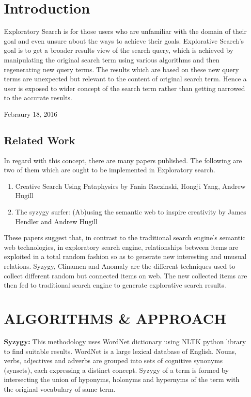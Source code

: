 \documentclass[conference]{IEEEtran}
\begin{document}
 

\section{Introduction}

\hspace{10 pt} Exploratory  Search is for those users who are unfamiliar with the domain of their goal and even unsure about the ways to achieve their goals. Explorative Search's goal is to get a broader results view of the search query, which is achieved by manipulating the original search term using various algorithms and then regenerating new query terms. The results which are based on these new query terms are unexpected but relevant to the content of original search term. Hence a user is exposed to wider concept of the search term rather than getting narrowed to the accurate results.

 
\hfill Febraury 18, 2016
\subsection{Related Work}


In regard with this concept, there are many papers published. The following are two of them which are  ought to be implemented in Exploratory search.\\
\begin{enumerate}
\item Creative Search Using Pataphysics by Fania Raczinski, Hongji Yang, Andrew Hugill
\item The syzygy surfer: (Ab)using the semantic web to inspire creativity by James Hendler and  Andrew Hugill \\
\end{enumerate}
These papers suggest that, in contrast to the traditional search engine's semantic web technologies, in exploratory search engine, relationships between items are exploited in a total random fashion so as to generate new interesting and unusual relations. Syzygy, Clinamen and Anomaly are the different techniques used to collect different random but connected items on web. The new collected items are then fed to traditional search engine to generate explorative search results.

\section{ALGORITHMS \& APPROACH}
\textbf{Syzygy:}
This methodology uses WordNet dictionary using NLTK python library to find suitable results. WordNet is a large lexical database of English. Nouns, verbs, adjectives and adverbs are grouped into sets of cognitive synonyms (synsets), each expressing a distinct concept. Syzygy of a term is formed by intersecting the union of hyponyms, holonyms and hypernyms of the term with the original vocabulary of same term.\\
\end{document}
